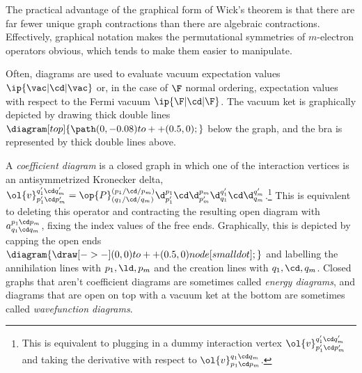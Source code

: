 \documentclass[11pt,fleqn]{article}
\numberwithin{equation}{section}
\begin{document}
\begin{rmk}
The practical advantage of the graphical form of Wick's theorem is that there are far fewer unique graph contractions than there are algebraic contractions.
Effectively, graphical notation makes the permutational symmetries of $m$-electron operators obvious, which tends to make them easier to manipulate.
\end{rmk}

\begin{ntt}
Often, diagrams are used to evaluate vacuum expectation values
$\ip{\vac|\cd|\vac}$
or, in the case of $\F$ normal ordering,
expectation values with respect to the Fermi vacuum
$\ip{\F|\cd|\F}$.
The vacuum ket is graphically depicted by drawing thick double lines
$\diagram[top]{\path (0,-0.08) to ++(0.5,0);}$
below the graph, and the bra is represented by thick double lines above.
\end{ntt}

\begin{dfn}
A \textit{coefficient diagram} is a closed graph in which one of the interaction vertices is an antisymmetrized Kronecker delta,
$\ol{v}^{q_1'\cd q_m'}_{p_1'\cd p_m'}=\op{P}^{(p_1/\cd /p_m)}_{(q_1/\cd /q_m)}\d^{p_1}_{p_1'}\cd \d^{p_m}_{p_m'}\d^{q_1'}_{q_1}\cd \d^{q_m'}_{q_m}$.\footnote{This is equivalent to plugging in a dummy interaction vertex $\ol{v}^{q_1'\cd q_m'}_{p_1'\cd p_m'}$ and taking the derivative with respect to $\ol{v}^{q_1\cd q_m}_{p_1\cd p_m}$.}
This is equivalent to deleting this operator and contracting the resulting open diagram with $a^{p_1\cd p_m}_{q_1\cd q_m}$, fixing the index values of the free ends.
Graphically, this is depicted by capping the open ends
$\diagram{\draw[->-] (0,0) to ++(0.5,0) node[smalldot] {};}$
and labelling the annihilation lines with $p_1,\ld,p_m$ and the creation lines with $q_1,\cd,q_m$.
Closed graphs that aren't coefficient diagrams are sometimes called \textit{energy diagrams}, and diagrams that are open on top with a vacuum ket at the bottom are sometimes called \textit{wavefunction diagrams}.
\end{dfn}
\end{document}
